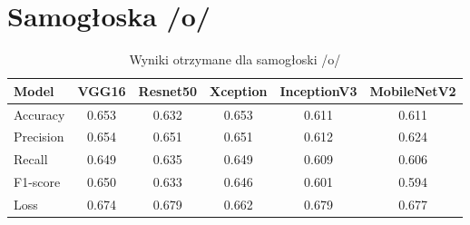 
\section{Samogłoska /o/}
\label{sec:samogloska-o}

\begin{table}[h]
\centering
\caption{Wyniki otrzymane dla samogłoski /o/}
\label{tab:wyniki-o}
\begin{tabular}{|l|c|c|c|c|c|}
\hline
\textbf{Model} &\textbf{VGG16} &\textbf{Resnet50} &\textbf{Xception} &\textbf{InceptionV3} &\textbf{MobileNetV2} \\ \hline
    Accuracy &0.653 &0.632 &0.653 &0.611 &0.611 \\ \hline
    Precision &0.654 &0.651 &0.651 &0.612 &0.624 \\ \hline
    Recall &0.649 &0.635 &0.649 &0.609 &0.606 \\ \hline
    F1-score &0.650 &0.633 &0.646 &0.601 &0.594 \\ \hline
    Loss &0.674 &0.679 &0.662 &0.679 &0.677 \\ \hline
\end{tabular}
\end{table}

